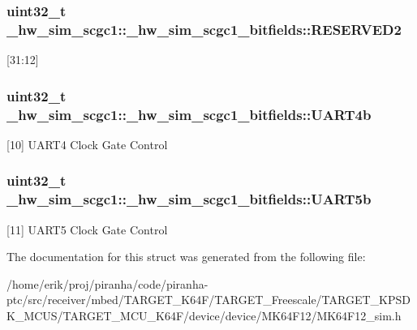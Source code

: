 \subsubsection[{\texorpdfstring{R\+E\+S\+E\+R\+V\+E\+D2}{RESERVED2}}]{\setlength{\rightskip}{0pt plus 5cm}uint32\+\_\+t \+\_\+hw\+\_\+sim\+\_\+scgc1\+::\+\_\+hw\+\_\+sim\+\_\+scgc1\+\_\+bitfields\+::\+R\+E\+S\+E\+R\+V\+E\+D2}\hypertarget{struct__hw__sim__scgc1_1_1__hw__sim__scgc1__bitfields_a79e36c0dff65f8ccf43d8cb827d3e637}{}\label{struct__hw__sim__scgc1_1_1__hw__sim__scgc1__bitfields_a79e36c0dff65f8ccf43d8cb827d3e637}
\mbox{[}31\+:12\mbox{]} 
\subsubsection[{\texorpdfstring{U\+A\+R\+T4b}{UART4b}}]{\setlength{\rightskip}{0pt plus 5cm}uint32\+\_\+t \+\_\+hw\+\_\+sim\+\_\+scgc1\+::\+\_\+hw\+\_\+sim\+\_\+scgc1\+\_\+bitfields\+::\+U\+A\+R\+T4b}\hypertarget{struct__hw__sim__scgc1_1_1__hw__sim__scgc1__bitfields_a9e8886908f3cbbec790d2d30a3c7f483}{}\label{struct__hw__sim__scgc1_1_1__hw__sim__scgc1__bitfields_a9e8886908f3cbbec790d2d30a3c7f483}
\mbox{[}10\mbox{]} U\+A\+R\+T4 Clock Gate Control 
\subsubsection[{\texorpdfstring{U\+A\+R\+T5b}{UART5b}}]{\setlength{\rightskip}{0pt plus 5cm}uint32\+\_\+t \+\_\+hw\+\_\+sim\+\_\+scgc1\+::\+\_\+hw\+\_\+sim\+\_\+scgc1\+\_\+bitfields\+::\+U\+A\+R\+T5b}\hypertarget{struct__hw__sim__scgc1_1_1__hw__sim__scgc1__bitfields_a62d895087116926a7cd1b840c9d33cb1}{}\label{struct__hw__sim__scgc1_1_1__hw__sim__scgc1__bitfields_a62d895087116926a7cd1b840c9d33cb1}
\mbox{[}11\mbox{]} U\+A\+R\+T5 Clock Gate Control 

The documentation for this struct was generated from the following file\+:\begin{DoxyCompactItemize}
\item 
/home/erik/proj/piranha/code/piranha-\/ptc/src/receiver/mbed/\+T\+A\+R\+G\+E\+T\+\_\+\+K64\+F/\+T\+A\+R\+G\+E\+T\+\_\+\+Freescale/\+T\+A\+R\+G\+E\+T\+\_\+\+K\+P\+S\+D\+K\+\_\+\+M\+C\+U\+S/\+T\+A\+R\+G\+E\+T\+\_\+\+M\+C\+U\+\_\+\+K64\+F/device/device/\+M\+K64\+F12/M\+K64\+F12\+\_\+sim.\+h\end{DoxyCompactItemize}
